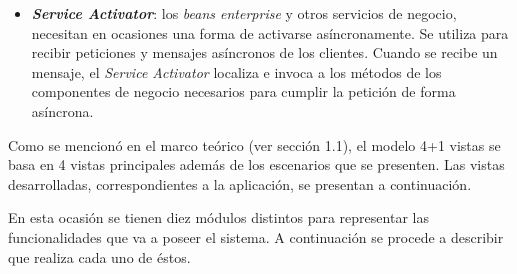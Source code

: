 \documentclass{memoria}
\begin{document}
\begin{itemize}
\begin{itemize}
\item \textbf{\textsl{Service Activator}}: los \textsl{beans enterprise} y otros servicios de negocio, necesitan en ocasiones una forma de activarse asíncronamente.
Se utiliza para recibir peticiones y mensajes asíncronos de los clientes. Cuando se recibe un mensaje, el \textsl{Service Activator} localiza e invoca a los métodos de los componentes de negocio necesarios para cumplir la petición de forma asíncrona.
\end{itemize}

\end{itemize} 


Como se mencionó en el marco teórico (ver sección 1.1), el modelo 4+1 vistas se basa en 4 vistas principales además de los escenarios que se presenten. Las vistas desarrolladas, correspondientes a la aplicación, se presentan a continuación.



En esta ocasión se tienen diez módulos distintos para representar las funcionalidades que va a poseer el sistema. A continuación se procede a describir que realiza cada uno de éstos.
\end{document}
